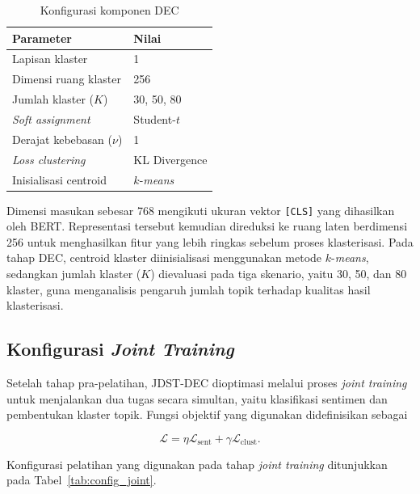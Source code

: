 \begin{table}[H]
    \centering
    \caption{Konfigurasi komponen DEC}
    \label{tab:config_dec}
    \renewcommand{\arraystretch}{1.15}
    \begin{tabular}{L{5.0cm} L{6.5cm}}
        \toprule
        \textbf{Parameter} & \textbf{Nilai} \\
        \midrule
        Lapisan klaster           & 1 \\
        Dimensi ruang klaster     & 256 \\
        Jumlah klaster ($K$)      & 30, 50, 80 \\
        \textit{Soft assignment}  & Student-$t$ \\
        Derajat kebebasan ($\nu$) & 1 \\
        \textit{Loss clustering}  & KL Divergence \\
        Inisialisasi centroid     & $k$-\textit{means} \\
        \bottomrule
    \end{tabular}
\end{table}

Dimensi masukan sebesar 768 mengikuti ukuran vektor \texttt{[CLS]}
yang dihasilkan oleh BERT. Representasi tersebut kemudian direduksi ke
ruang laten berdimensi 256 untuk menghasilkan fitur yang lebih ringkas
sebelum proses klasterisasi. Pada tahap DEC, centroid klaster
diinisialisasi menggunakan metode $k$-\textit{means}, sedangkan jumlah
klaster ($K$) dievaluasi pada tiga skenario, yaitu 30, 50, dan 80
klaster, guna menganalisis pengaruh jumlah topik terhadap kualitas
hasil klasterisasi.

\subsection{Konfigurasi \textit{Joint Training}}

Setelah tahap pra-pelatihan, JDST-DEC dioptimasi melalui proses
\textit{joint training} untuk menjalankan dua tugas secara simultan, yaitu
klasifikasi sentimen dan pembentukan klaster topik. Fungsi objektif yang
digunakan didefinisikan sebagai

\[
\mathcal{L} =
\eta \mathcal{L}_{\text{sent}} +
\gamma \mathcal{L}_{\text{clust}}.
\]

Konfigurasi pelatihan yang digunakan pada tahap \textit{joint training}
ditunjukkan pada Tabel~\ref{tab:config_joint}.

